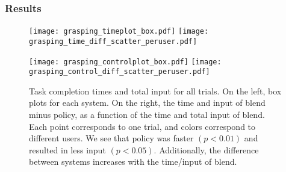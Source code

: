 \subsubsection{Results}

\begin{figure}[t]
   \texttt{[image: grasping\_timeplot\_box.pdf]}
 \hfill
   \texttt{[image: grasping\_time\_diff\_scatter\_peruser.pdf]}

   \texttt{[image: grasping\_controlplot\_box.pdf]}
   \hfill
   \texttt{[image: grasping\_control\_diff\_scatter\_peruser.pdf]}
   \caption{Task completion times and total input for all trials. On the left, box plots for each system. On the right, the time and input of blend minus policy, as a function of the time and total input of blend. Each point corresponds to one trial, and colors correspond to different users. We see that policy was faster $(p<0.01)$ and resulted in less input $(p<0.05)$. Additionally, the difference between systems increases with the time/input of blend.}
 \label{fig:time_control_plots}
 \end{figure}


